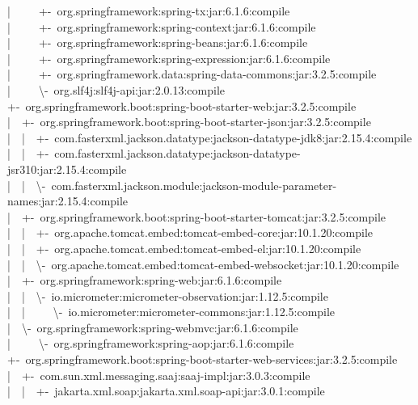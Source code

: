 |~~~~~+-~org.springframework:spring-tx:jar:6.1.6:compile\\
|~~~~~+-~org.springframework:spring-context:jar:6.1.6:compile\\
|~~~~~+-~org.springframework:spring-beans:jar:6.1.6:compile\\
|~~~~~+-~org.springframework:spring-expression:jar:6.1.6:compile\\
|~~~~~+-~org.springframework.data:spring-data-commons:jar:3.2.5:compile\\
|~~~~~\textbackslash-~org.slf4j:slf4j-api:jar:2.0.13:compile\\
+-~org.springframework.boot:spring-boot-starter-web:jar:3.2.5:compile\\
|~~+-~org.springframework.boot:spring-boot-starter-json:jar:3.2.5:compile\\
|~~|~~+-~com.fasterxml.jackson.datatype:jackson-datatype-jdk8:jar:2.15.4:compile\\
|~~|~~+-~com.fasterxml.jackson.datatype:jackson-datatype-jsr310:jar:2.15.4:compile\\
|~~|~~\textbackslash-~com.fasterxml.jackson.module:jackson-module-parameter-names:jar:2.15.4:compile\\
|~~+-~org.springframework.boot:spring-boot-starter-tomcat:jar:3.2.5:compile\\
|~~|~~+-~org.apache.tomcat.embed:tomcat-embed-core:jar:10.1.20:compile\\
|~~|~~+-~org.apache.tomcat.embed:tomcat-embed-el:jar:10.1.20:compile\\
|~~|~~\textbackslash-~org.apache.tomcat.embed:tomcat-embed-websocket:jar:10.1.20:compile\\
|~~+-~org.springframework:spring-web:jar:6.1.6:compile\\
|~~|~~\textbackslash-~io.micrometer:micrometer-observation:jar:1.12.5:compile\\
|~~|~~~~~\textbackslash-~io.micrometer:micrometer-commons:jar:1.12.5:compile\\
|~~\textbackslash-~org.springframework:spring-webmvc:jar:6.1.6:compile\\
|~~~~~\textbackslash-~org.springframework:spring-aop:jar:6.1.6:compile\\
+-~org.springframework.boot:spring-boot-starter-web-services:jar:3.2.5:compile\\
|~~+-~com.sun.xml.messaging.saaj:saaj-impl:jar:3.0.3:compile\\
|~~|~~+-~jakarta.xml.soap:jakarta.xml.soap-api:jar:3.0.1:compile\\
